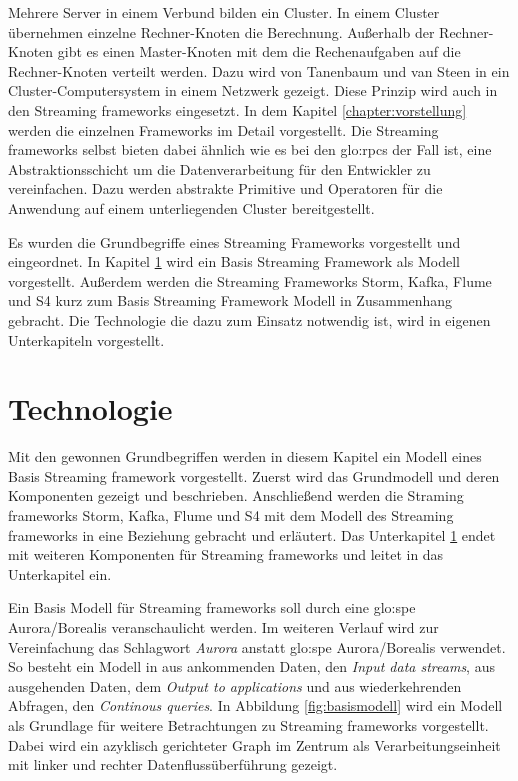 Mehrere Server in einem Verbund bilden ein Cluster. In einem Cluster übernehmen einzelne Rechner-Knoten die Berechnung. Außerhalb der Rechner-Knoten gibt es einen Master-Knoten mit dem die Rechenaufgaben auf die Rechner-Knoten verteilt werden. Dazu wird von Tanenbaum und van Steen in  ein Cluster-Computersystem in einem Netzwerk gezeigt. Diese Prinzip wird auch in den Streaming frameworks eingesetzt. In dem Kapitel \ref{chapter:vorstellung} werden die einzelnen Frameworks im Detail vorgestellt. Die Streaming frameworks selbst bieten dabei ähnlich wie es bei den \glspl{glo:rpc} der Fall ist, eine Abstraktionsschicht um die Datenverarbeitung für den Entwickler zu vereinfachen. Dazu werden abstrakte Primitive und Operatoren für die Anwendung auf einem unterliegenden Cluster bereitgestellt.

Es wurden die Grundbegriffe eines Streaming Frameworks vorgestellt und eingeordnet. In Kapitel \ref{section:technologie} wird ein Basis Streaming Framework als Modell vorgestellt. Außerdem werden die Streaming Frameworks Storm, Kafka, Flume und S4 kurz zum Basis Streaming Framework Modell in Zusammenhang gebracht. Die Technologie die dazu zum Einsatz notwendig ist, wird in eigenen Unterkapiteln vorgestellt.

\section{Technologie}
\label{section:technologie}

Mit den gewonnen Grundbegriffen werden in diesem Kapitel ein Modell eines Basis Streaming framework vorgestellt. Zuerst wird das Grundmodell und deren Komponenten gezeigt und beschrieben. Anschließend werden die Straming frameworks Storm, Kafka, Flume und S4 mit dem Modell des Streaming frameworks in eine Beziehung gebracht und erläutert. Das Unterkapitel \ref{section:technologie} endet mit weiteren Komponenten für Streaming frameworks und leitet in das Unterkapitel  ein.


Ein Basis Modell für Streaming frameworks soll durch eine \gls{glo:spe} Aurora/Borealis  veranschaulicht werden. Im weiteren Verlauf wird zur Vereinfachung das Schlagwort \textit{Aurora} anstatt \gls{glo:spe} Aurora/Borealis verwendet. So besteht ein Modell in  aus ankommenden Daten, den \textit{Input data streams}, aus ausgehenden Daten, dem \textit{Output to applications} und aus wiederkehrenden Abfragen, den \textit{Continous queries}. In Abbildung \ref{fig:basismodell} wird ein Modell als Grundlage für weitere Betrachtungen zu Streaming frameworks vorgestellt. Dabei wird ein azyklisch gerichteter Graph im Zentrum als Verarbeitungseinheit mit linker und rechter Datenflussüberführung gezeigt.


